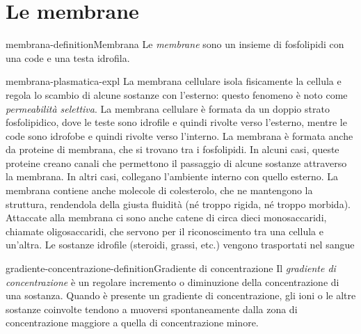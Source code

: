 \documentclass[preview]{standalone}
\begin{document}
\genpage

\section{Le membrane}



\begin{snippetdefinition}{membrana-definition}{Membrana}
    Le \textit{membrane} sono un insieme di fosfolipidi con una code e una testa idrofila.
\end{snippetdefinition}

\begin{snippet}{membrana-plasmatica-expl}
    La membrana cellulare isola fisicamente la cellula e regola lo scambio di alcune sostanze
    con l'esterno: questo fenomeno è noto come \textit{permeabilità selettiva}. La membrana cellulare
    è formata da un doppio strato fosfolipidico, dove le teste sono idrofile e quindi rivolte verso
    l'esterno, mentre le code sono idrofobe e quindi rivolte verso l'interno. La membrana è
    formata anche da proteine di membrana, che si trovano tra i fosfolipidi. In alcuni casi, queste
    proteine creano canali che permettono il passaggio di alcune sostanze attraverso la
    membrana. In altri casi, collegano l'ambiente interno con quello esterno. La membrana
    contiene anche molecole di colesterolo, che ne mantengono la struttura, rendendola della
    giusta fluidità (né troppo rigida, né troppo morbida). Attaccate alla membrana ci sono anche
    catene di circa dieci monosaccaridi, chiamate oligosaccaridi, che servono per il
    riconoscimento tra una cellula e un'altra.
    Le sostanze idrofile (steroidi, grassi, etc.) vengono trasportati nel sangue
\end{snippet}

\begin{snippetdefinition}{gradiente-concentrazione-definition}{Gradiente di concentrazione}
    Il \textit{gradiente di concentrazione} è un regolare incremento o diminuzione della concentrazione di una sostanza. Quando è presente un gradiente di concentrazione, gli ioni o le altre sostanze coinvolte tendono a muoversi spontaneamente dalla zona di concentrazione maggiore a quella di concentrazione minore.
\end{snippetdefinition}
\end{document}
